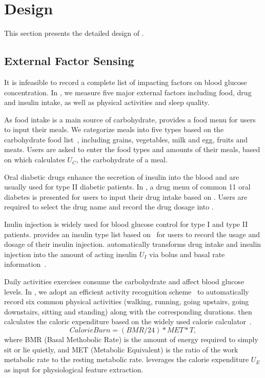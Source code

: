 
\section{Design}
\label{sec:design}
This section presents the detailed design of \sysname.

\subsection{External Factor Sensing}
\label{subsec:external}
It is infeasible to record a complete list of impacting factors on blood glucose concentration.
In \sysname, we measure five major external factors including food, drug and insulin intake, as well as physical activities and sleep quality.

As food intake is a main source of carbohydrate, \sysname provides a food menu for users to input their meals.
We categorize meals into five types based on the carbohydrate food list~\cite{bib:carblist}, including grains, vegetables, milk and egg, fruits and meats.
Users are asked to enter the food types and amounts of their meals, based on which \sysname calculates $U_C$, the carbohydrate of a meal.

Oral diabetic drugs enhance the secretion of insulin into the blood and are usually used for type II diabetic patients.
In \sysname, a drug menu of common 11 oral diabetes is presented for users to input their drug intake based on \cite{bib:druglist}.
Users are required to select the drug name and record the drug dosage into \sysname.

Inulin injection is widely used for blood glucose control for type I and type II patients.
\sysname provides an insulin type list based on~\cite{bib:insulinlist} for users to record the usage and dosage of their insulin injection.
\sysname automatically transforms drug intake and insulin injection into the amount of acting insulin $U_I$ via bolus and basal rate information~\cite{bib:MAIHA14:Plis}.

Daily activities \eg exercises consume the carbohydrate and affect blood glucose levels.
In \sysname, we adopt an efficient activity recognition scheme~\cite{bib:KDDEN11:Kwapisz} to automatically record six common physical activities (walking, running, going upstairs, going downstairs, sitting and standing) along with the corresponding durations.
\sysname then calculates the caloric expenditure based on the widely used calorie calculator~\cite{bib:HealthStatus, bib:CalorieCounter}.
\begin{equation}\label{eq:calorie_burn}
  Calorie Burn = (BMR/24)*MET*T,
\end{equation}
where BMR (Basal Methobolic Rate) is the amount of energy required to simply sit or lie quietly, and MET (Metabolic Equivalent) is the ratio of the work metabolic rate to the resting metabolic rate.
\sysname leverages the calorie expenditure $U_E$ as input for physiological feature extraction.


